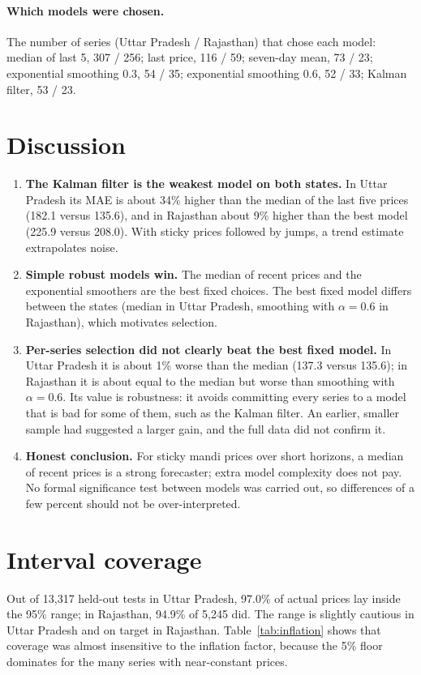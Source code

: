 \documentclass[12pt,a4paper,oneside]{report}
\numberwithin{equation}{chapter}
\numberwithin{figure}{chapter}
\numberwithin{table}{chapter}
\theoremstyle{definition}
\begin{document}
\paragraph{Which models were chosen.} The number of series (Uttar Pradesh / Rajasthan) that chose each model: median of last 5, 307 / 256; last price, 116 / 59; seven-day mean, 73 / 23; exponential smoothing 0.3, 54 / 35; exponential smoothing 0.6, 52 / 33; Kalman filter, 53 / 23.

\section{Discussion}
\begin{enumerate}
  \item \textbf{The Kalman filter is the weakest model on both states.} In Uttar Pradesh its MAE is about 34\% higher than the median of the last five prices (182.1 versus 135.6), and in Rajasthan about 9\% higher than the best model (225.9 versus 208.0). With sticky prices followed by jumps, a trend estimate extrapolates noise.
  \item \textbf{Simple robust models win.} The median of recent prices and the exponential smoothers are the best fixed choices. The best fixed model differs between the states (median in Uttar Pradesh, smoothing with $\alpha=0.6$ in Rajasthan), which motivates selection.
  \item \textbf{Per-series selection did not clearly beat the best fixed model.} In Uttar Pradesh it is about 1\% worse than the median (137.3 versus 135.6); in Rajasthan it is about equal to the median but worse than smoothing with $\alpha=0.6$. Its value is robustness: it avoids committing every series to a model that is bad for some of them, such as the Kalman filter. An earlier, smaller sample had suggested a larger gain, and the full data did not confirm it.
  \item \textbf{Honest conclusion.} For sticky mandi prices over short horizons, a median of recent prices is a strong forecaster; extra model complexity does not pay. No formal significance test between models was carried out, so differences of a few percent should not be over-interpreted.
\end{enumerate}

\section{Interval coverage}
Out of 13{,}317 held-out tests in Uttar Pradesh, 97.0\% of actual prices lay inside the 95\% range; in Rajasthan, 94.9\% of 5{,}245 did. The range is slightly cautious in Uttar Pradesh and on target in Rajasthan. Table~\ref{tab:inflation} shows that coverage was almost insensitive to the inflation factor, because the 5\% floor dominates for the many series with near-constant prices.
\end{document}
